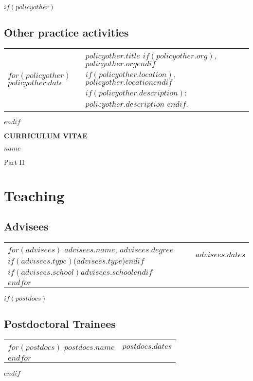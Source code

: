 \documentclass[12pt, martgin, line]{article}
\begin{document}
$if(policyother)$
\subsection*{Other practice activities}
\setlength{\extrarowheight}{.75em}
\begin{longtable}[l]{lp{5in}}   
$for(policyother)$
$policyother.date$&
\parbox[t]{5in}{
   \textit{$policyother.title$%
   $if(policyother.org)$, $policyother.org$$endif$%
   $if(policyother.location)$, $policyother.location$$endif$}%
   $if(policyother.description)$: %
   $policyother.description$%
   $endif$.%
 }\\
$endfor$
\end{longtable}
\setlength{\extrarowheight}{0em}
$endif$

  

\clearpage
  \begin{center}
    \textbf{CURRICULUM VITAE}

    \textbf{$name$}

    Part II
  \end{center}

\section*{Teaching}
\subsection*{Advisees}

\setlength{\extrarowheight}{.25em}
\begin{tabular}{ll}   
$for(advisees)$
$advisees.name$, $advisees.degree$
$if(advisees.type)$($advisees.type$)$endif$&
$advisees.dates$\\
$if(advisees.school)$$advisees.school$$endif$\\
$endfor$
\end{tabular}
\setlength{\extrarowheight}{0em}

$if(postdocs)$
\subsection*{Postdoctoral Trainees}
\setlength{\extrarowheight}{.25em}
\begin{tabular}{ll}   
$for(postdocs)$
$postdocs.name$&
$postdocs.dates$\\
$endfor$
\end{tabular}
\setlength{\extrarowheight}{0em}
$endif$
\end{document}
